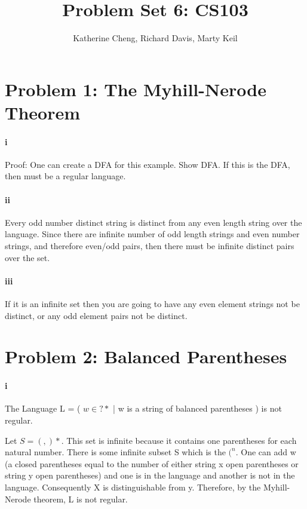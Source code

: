 \documentclass[10pt,letter]{article}
\begin{document}

\title{Problem Set 6: CS103}

\author{Katherine Cheng, Richard Davis, Marty Keil}

 
\maketitle

\section*{Problem 1: The Myhill-Nerode Theorem}
\paragraph{i}
Proof: One can create a DFA for this example. Show DFA. If this is the DFA, then must be a regular language. 

\paragraph{ii}
Every odd number distinct string is distinct from any even length string over the language. Since there are infinite number of odd length strings and even number strings, and therefore even/odd pairs, then there must be infinite distinct pairs over the set. 

\paragraph{iii}
If it is an infinite set then you are going to have any even element strings not be distinct, or any odd element pairs not be distinct. 

\section*{Problem 2: Balanced Parentheses}
\paragraph{i}
\thm The Language L = ( $w \in ?*$ | w is a string of balanced parentheses ) is not regular. 

\proof Let $S = (,)*.$ This set is infinite because it contains one parentheses for each natural number. There is some infinite subset S which is the $(^n$. One can add w (a closed parentheses equal to the number of either string x open parentheses or string y open parentheses) and one is in the language and another is not in the language.  Consequently X is distinguishable from y. Therefore, by the Myhill-Nerode theorem, L is not regular. 
\end{document}
